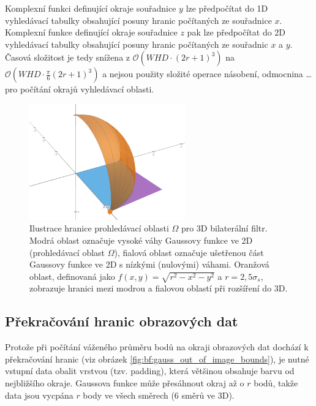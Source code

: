 Komplexní funkci definující okraje souřadnice $y$ lze předpočítat do 1D vyhledávací tabulky obsahující posuny hranic počítaných ze souřadnice $x$. Komplexní funkce definující okraje souřadnice $z$ pak lze předpočítat do 2D vyhledávací tabulky obsahující posuny hranic počítaných ze souřadnic $x$ a $y$. Časová složitost je tedy snížena z $\mathcal{O}(WHD\cdot(2r+1)^3)$ na $\mathcal{O}(WHD\cdot\frac{\pi}{6}(2r+1)^3)$ a nejsou použity složité operace násobení, odmocnina \dots pro počítání okrajů vyhledávací oblasti.

\begin{figure} [H]
    \centering
    \label{fig:bf:3d_bias}
    \includegraphics[width=0.6\textwidth]{figures/bf-3d-bias.png}
    \caption{Ilustrace hranice prohledávací oblasti $\Omega$ pro 3D bilaterální filtr. Modrá oblast označuje vysoké váhy Gaussovy funkce ve 2D (prohledávací oblast $\Omega$), fialová oblast označuje ušetřenou část Gaussovy funkce ve 2D s nízkými (nulovými) váhami. Oranžová oblast, definovaná jako $f(x,y)=\sqrt{r^2-x^2-y^2}$ a $r=2,5\sigma_s$, zobrazuje hranici mezi modrou a fialovou oblastí při rozšíření do 3D.}
\end{figure}

\subsection*{Překračování hranic obrazových dat}
Protože při počítání váženého průměru bodů na okraji obrazových dat dochází k překračování hranic (viz obrázek \ref{fig:bf:gauss_out_of_image_bounds}), je nutné vstupní data obalit vrstvou (tzv. padding), která většinou obsahuje barvu od nejbližšího okraje. Gaussova funkce může přesáhnout okraj až o $r$ bodů, takže data jsou vycpána $r$ body ve všech směrech (6 směrů ve 3D). 

